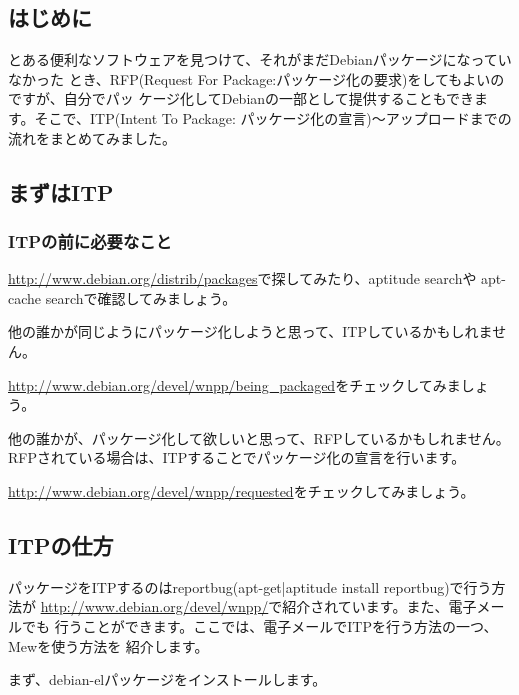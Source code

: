 \documentclass[mingoth,a4paper]{jsarticle}
\begin{document}
\clearpage

\subsection{はじめに}
とある便利なソフトウェアを見つけて、それがまだDebianパッケージになっていなかった
とき、RFP(Request For Package:パッケージ化の要求)をしてもよいのですが、自分でパッ
ケージ化してDebianの一部として提供することもできます。そこで、ITP(Intent To Package:
パッケージ化の宣言)〜アップロードまでの流れをまとめてみました。

\subsection{まずはITP}
\subsubsection{ITPの前に必要なこと}
\url{http://www.debian.org/distrib/packages}で探してみたり、aptitude searchや
apt-cache searchで確認してみましょう。

他の誰かが同じようにパッケージ化しようと思って、ITPしているかもしれません。

\url{http://www.debian.org/devel/wnpp/being\_packaged}をチェックしてみましょう。

他の誰かが、パッケージ化して欲しいと思って、RFPしているかもしれません。
RFPされている場合は、ITPすることでパッケージ化の宣言を行います。

\url{http://www.debian.org/devel/wnpp/requested}をチェックしてみましょう。

\subsection{ITPの仕方}
パッケージをITPするのはreportbug(apt-get|aptitude install reportbug)で行う方法が
\url{http://www.debian.org/devel/wnpp/}で紹介されています。また、電子メールでも
行うことができます。ここでは、電子メールでITPを行う方法の一つ、Mewを使う方法を
紹介します。

まず、debian-elパッケージをインストールします。

 
\end{document}
